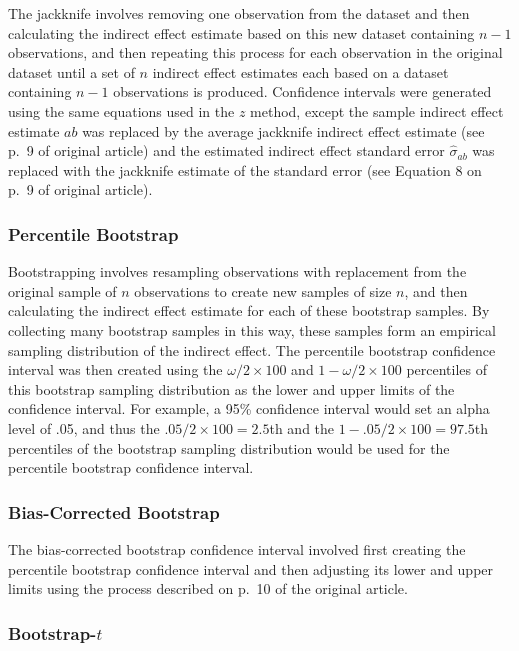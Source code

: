 \documentclass[10,a4paperpaper,]{article}
\begin{document}
The jackknife involves removing one observation from the dataset and
then calculating the indirect effect estimate based on this new dataset
containing \(n-1\) observations, and then repeating this process for
each observation in the original dataset until a set of \(n\) indirect
effect estimates each based on a dataset containing \(n-1\) observations
is produced. Confidence intervals were generated using the same
equations used in the \(z\) method, except the sample indirect effect
estimate \(ab\) was replaced by the average jackknife indirect effect
estimate (see p.~9 of original article) and the estimated indirect
effect standard error \(\hat{\sigma}_{ab}\) was replaced with the
jackknife estimate of the standard error (see Equation 8 on p.~9 of
original article).

\subsubsection{Percentile Bootstrap}

Bootstrapping involves resampling observations with replacement from the
original sample of \(n\) observations to create new samples of size
\(n\), and then calculating the indirect effect estimate for each of
these bootstrap samples. By collecting many bootstrap samples in this
way, these samples form an empirical sampling distribution of the
indirect effect. The percentile bootstrap confidence interval was then
created using the \(\omega/2 \times 100\) and \(1- \omega/2 \times 100\)
percentiles of this bootstrap sampling distribution as the lower and
upper limits of the confidence interval. For example, a 95\% confidence
interval would set an alpha level of .05, and thus the
\(.05/2 \times 100 = 2.5\)th and the \(1- .05/2 \times 100 = 97.5\)th
percentiles of the bootstrap sampling distribution would be used for the
percentile bootstrap confidence interval.

\subsubsection{Bias-Corrected Bootstrap}

The bias-corrected bootstrap confidence interval involved first creating
the percentile bootstrap confidence interval and then adjusting its
lower and upper limits using the process described on p.~10 of the
original article.

\subsubsection{Bootstrap-$t$}
\end{document}
